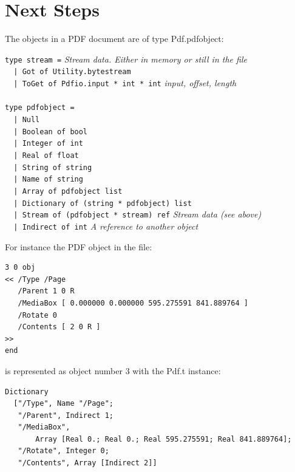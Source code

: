 \documentclass[a4paper]{memoir}
\begin{document}
\section*{Next Steps}
The objects in a PDF document are of type \textsf{Pdf.pdfobject}:
\begin{framed}
\noindent\verb!type stream =! \textit{Stream data. Either in memory or still in the file}\\
\verb!  | Got of Utility.bytestream!\\
\verb!  | ToGet of Pdfio.input * int * int! \textit{input, offset, length}\\
\verb!!\\
\verb!type pdfobject =!\\
\verb!  | Null!\\
\verb!  | Boolean of bool!\\
\verb!  | Integer of int!\\
\verb!  | Real of float!\\
\verb!  | String of string!\\
\verb!  | Name of string!\\
\verb!  | Array of pdfobject list!\\
\verb!  | Dictionary of (string * pdfobject) list!\\
\verb!  | Stream of (pdfobject * stream) ref! \textit{Stream data (see above)}\\
\verb!  | Indirect of int! \textit{A reference to another object}\\
\end{framed}

\noindent For instance the PDF object in the file:

\begin{framed}
\begin{verbatim}
3 0 obj
<< /Type /Page
   /Parent 1 0 R
   /MediaBox [ 0.000000 0.000000 595.275591 841.889764 ]
   /Rotate 0
   /Contents [ 2 0 R ]
>>
end
\end{verbatim}
\end{framed}

\noindent is represented as object number 3 with the Pdf.t instance:
\begin{framed}
\small\begin{verbatim}
Dictionary
  ["/Type", Name "/Page";
   "/Parent", Indirect 1;
   "/MediaBox",
       Array [Real 0.; Real 0.; Real 595.275591; Real 841.889764];
   "/Rotate", Integer 0;
   "/Contents", Array [Indirect 2]]
\end{verbatim}
\end{framed}
\end{document}

